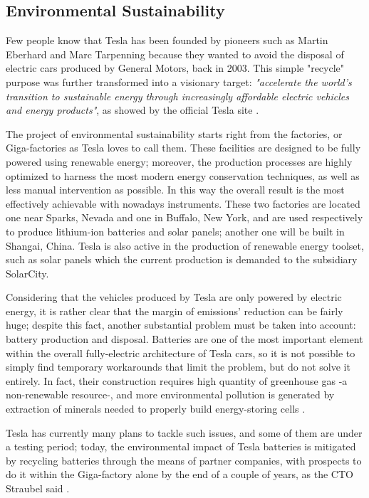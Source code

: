 \subsection{Environmental Sustainability}

Few people know that Tesla has been founded by pioneers such as Martin Eberhard and Marc Tarpenning because they wanted to avoid the disposal of electric cars produced by General Motors, back in 2003. \cite{muskGM} This simple "recycle" purpose was further transformed into a visionary target: \emph{"accelerate the world’s transition to sustainable energy through increasingly affordable electric vehicles and energy products"}, as showed by the official Tesla site \cite{aboutTesla}.

The project of environmental sustainability starts right from the factories, or Giga-factories as Tesla loves to call them. These facilities are designed to be fully powered using renewable energy; moreover, the production processes are highly optimized to harness the most modern energy conservation techniques, as well as less manual intervention as possible. In this way the overall result is the most effectively achievable with nowadays instruments. These two factories are located one near Sparks, Nevada and one in Buffalo, New York, and are used respectively to produce lithium-ion batteries and solar panels; another one will be built in Shangai, China. Tesla is also active in the production of renewable energy toolset, such as solar panels which the current production is demanded to the subsidiary SolarCity.

Considering that the vehicles produced by Tesla are only powered by electric energy, it is rather clear that the margin of emissions' reduction can be fairly huge; despite this fact, another substantial problem must be taken into account: battery production and disposal. Batteries are one of the most important element within the overall fully-electric architecture of Tesla cars, so it is not possible to simply find temporary workarounds that limit the problem, but do not solve it entirely. In fact, their construction requires high quantity of greenhouse gas -a non-renewable resource-, and more environmental pollution is generated by extraction of minerals needed to properly build energy-storing cells \cite{tesla_scheele_cobalt}.

Tesla has currently many plans to tackle such issues, and some of them are under a testing period; today, the environmental impact of Tesla batteries is mitigated by recycling batteries through the means of partner companies, with prospects to do it within the Giga-factory alone by the end of a couple of years, as the CTO Straubel said \cite{tesla_recycle_battery}.


